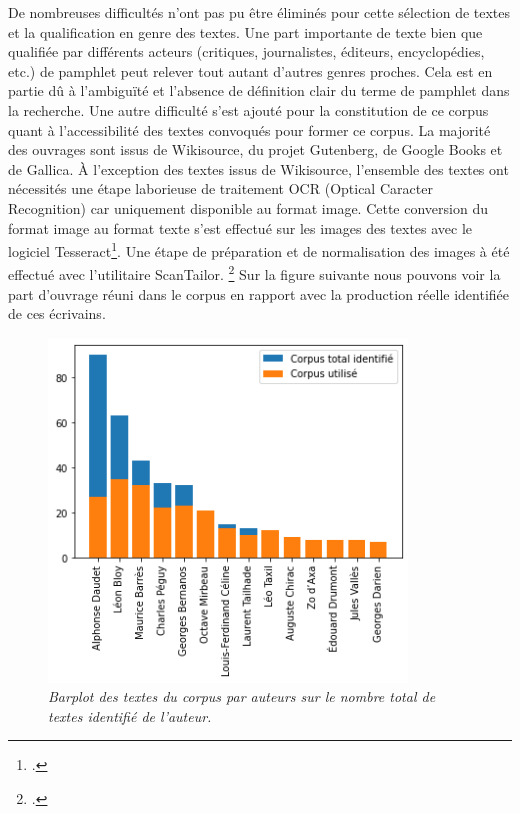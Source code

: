De nombreuses difficultés n'ont pas pu être éliminés pour cette sélection de textes et la qualification en genre des textes. Une part importante de texte bien que qualifiée par différents acteurs (critiques, journalistes, éditeurs, encyclopédies, etc.) de pamphlet peut relever tout autant d'autres genres proches. Cela est en partie dû à l'ambiguïté et l'absence de définition clair du terme de pamphlet dans la recherche.
Une autre difficulté s'est ajouté pour la constitution de ce corpus quant à l'accessibilité des textes convoqués pour former ce corpus. La majorité des ouvrages sont issus de Wikisource, du projet Gutenberg, de Google Books et de Gallica. À l'exception des textes issus de Wikisource, l'ensemble des textes ont nécessités une étape laborieuse de traitement OCR (Optical Caracter Recognition) car uniquement disponible au format image. Cette conversion du format image au format texte s'est effectué sur les images des textes avec le logiciel Tesseract\footcites{noauthor_tesseract-ocrtesseract_nodate}. Une étape de préparation et de normalisation des images à été effectué avec l'utilitaire ScanTailor. \footcites{noauthor_4lex4scantailor-advanced_nodate}
Sur la figure suivante nous pouvons voir la part d'ouvrage réuni dans le corpus en rapport avec la production réelle identifiée de ces écrivains.
 \begin{figure}[H]
\centering %
\includegraphics[width=0.85\textwidth]{img/barplot_corpus_auteurs.png}
\caption{\textit{Barplot des textes du corpus par auteurs sur le nombre total de textes identifié de l'auteur.}}
\end{figure}


